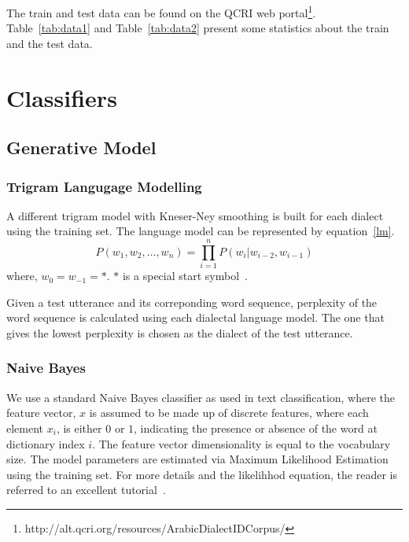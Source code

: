 \documentclass{article}
\newcommand{\ra}[1]{\renewcommand{\arraystretch}{#1}}
\begin{document}
The train and test data can be found on the QCRI web portal\footnote{http://alt.qcri.org/resources/ArabicDialectIDCorpus/}. Table~\ref{tab:data1} and Table~\ref{tab:data2} present some statistics about the train and the test data.

\begin{table}[pht!]
\centering
\ra{1.3}
\caption{\textit{Number of speech utterances for each dialect.}}\label{tab:data2}
\end{table}
 
\section{Classifiers}
\label{sec:classifier}
\subsection{Generative Model}
\subsubsection{Trigram Langugage Modelling}
A different trigram model with Kneser-Ney smoothing is built for each dialect using the training set. The language model can be represented by equation~\ref{lm}.
\begin{equation}
  P(w_{1},w_{2},\ldots,w_{n})=\prod_{i=1}^{n} P(w_{i} | w_{i-2},w_{i-1}) \label{lm}
\end{equation}
where, $w_{0}=w_{-1}=*$. $*$ is a special start symbol~\cite{Collins}.

Given a test utterance and its correponding word sequence, perplexity of the word sequence is calculated using each dialectal language model. The one that gives the lowest perplexity is chosen as the dialect of the test utterance.

\subsubsection{Naive Bayes}
We use a standard Naive Bayes classifier as used in text classification, where the feature vector, $x$ is assumed to be made up of discrete features, where each element $x_{i}$, is either $0$ or $1$, indicating the presence or absence of the word at dictionary index $i$. The feature vector dimensionality is equal to the vocabulary size. The model parameters are estimated via Maximum Likelihood Estimation using the training set. For more details and the likelihhod equation, the reader is referred to an excellent tutorial~\cite{Ng}.
\end{document}
